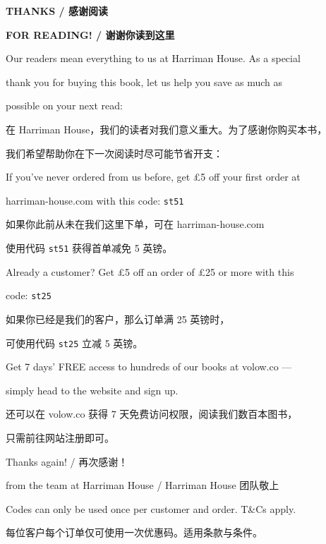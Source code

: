 \clearpage \thispagestyle{empty} \begin{center}
{\Large\bfseries THANKS / 感谢阅读\par}
\smallskip
{\Large\bfseries FOR READING! / 谢谢你读到这里\par}
\vspace{1.5em} Our readers mean everything to us at Harriman House. As a special \par thank you for buying this book, let us help you save as much as \par possible on your next read: \par \smallskip 在 Harriman House，我们的读者对我们意义重大。为了感谢你购买本书， \par 我们希望帮助你在下一次阅读时尽可能节省开支： \par \vspace{1.5em} If you've never ordered from us before, get \pounds5 off your first order at \par harriman-house.com with this code: \texttt{st51} \par \smallskip 如果你此前从未在我们这里下单，可在 harriman-house.com \par 使用代码 \texttt{st51} 获得首单减免 5 英镑。 \par \vspace{1em} Already a customer? Get \pounds5 off an order of \pounds25 or more with this \par code: \texttt{st25} \par \smallskip 如果你已经是我们的客户，那么订单满 25 英镑时， \par 可使用代码 \texttt{st25} 立减 5 英镑。 \par \vspace{1em} Get 7 days' FREE access to hundreds of our books at volow.co --- \par simply head to the website and sign up. \par \smallskip 还可以在 volow.co 获得 7 天免费访问权限，阅读我们数百本图书， \par 只需前往网站注册即可。 \par \vspace{1.5em} Thanks again! / 再次感谢！ \par from the team at Harriman House / Harriman House 团队敬上 \par \vfill
{\footnotesize Codes can only be used once per customer and order. T\&Cs apply.\par
每位客户每个订单仅可使用一次优惠码。适用条款与条件。 \par } \end{center}
